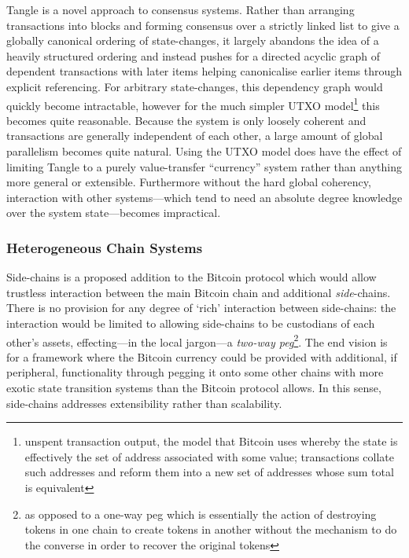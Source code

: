 \documentclass[9pt,oneside]{amsart}
\begin{document}
\begin{multicols}{2}
Tangle \cite{iota2016tangle} is a novel approach to consensus systems. Rather than arranging transactions into blocks and forming consensus over a strictly linked list to give a globally canonical ordering of state-changes, it largely abandons the idea of a heavily structured ordering and instead pushes for a directed acyclic graph of dependent transactions with later items helping canonicalise earlier items through explicit referencing. For arbitrary state-changes, this dependency graph would quickly become intractable, however for the much simpler UTXO model\footnote{unspent transaction output, the model that Bitcoin uses whereby the state is effectively the set of address associated with some value; transactions collate such addresses and reform them into a new set of addresses whose sum total is equivalent} this becomes quite reasonable. Because the system is only loosely coherent and transactions are generally independent of each other, a large amount of global parallelism becomes quite natural. Using the UTXO model does have the effect of limiting Tangle to a purely value-transfer ``currency'' system rather than anything more general or extensible. Furthermore without the hard global coherency, interaction with other systems---which tend to need an absolute degree knowledge over the system state---becomes impractical.

\subsubsection{Heterogeneous Chain Systems}\label{heterogenous}

Side-chains \cite{blockstream2014sidechains} is a proposed addition to the Bitcoin protocol which would allow trustless interaction between the main Bitcoin chain and additional \textit{side}-chains. There is no provision for any degree of `rich' interaction between side-chains: the interaction would be limited to allowing side-chains to be custodians of each other's assets, effecting---in the local jargon---a \textit{two-way peg}\footnote{as opposed to a one-way peg which is essentially the action of destroying tokens in one chain to create tokens in another without the mechanism to do the converse in order to recover the original tokens}. The end vision is for a framework where the Bitcoin currency could be provided with additional, if peripheral, functionality through pegging it onto some other chains with more exotic state transition systems than the Bitcoin protocol allows. In this sense, side-chains addresses extensibility rather than scalability.


\end{multicols}
\end{document}
